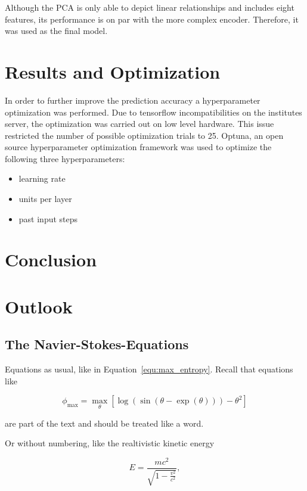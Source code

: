 \documentclass[11pt,table]{article}
\begin{document}
Although the PCA is only able to depict linear relationships and includes eight features, its performance is on par with the more complex encoder. Therefore, it was used as the final model.


\section{Results and Optimization}
In order to further improve the prediction accuracy a hyperparameter optimization was performed. Due to tensorflow incompatibilities on the institutes server, the optimization was carried out on low level hardware. This issue restricted the number of possible optimization trials to 25. Optuna, an open source hyperparameter optimization framework was used to optimize the following three hyperparameters: 
\begin{itemize}
\item learning rate
\item units per layer
\item past input steps
\end{itemize}


\section{Conclusion}
\section{Outlook}

\subsection{The Navier-Stokes-Equations}

Equations as usual, like in Equation~\ref{equ:max_entropy}. Recall that equations like

\begin{equation}\label{equ:max_entropy}
	\phi_\mathrm{max} = \max_{\theta} \left[ \log(\sin(\theta - \exp(\theta))) - \theta^2 \right]
\end{equation}

are part of the text and should be treated like a word.


Or without numbering, like the realtivistic kinetic energy 

\begin{equation*}
	E = \frac{mc^2}{\sqrt{1 - \frac{v^2}{c^2}}},
\end{equation*}
\end{document}
